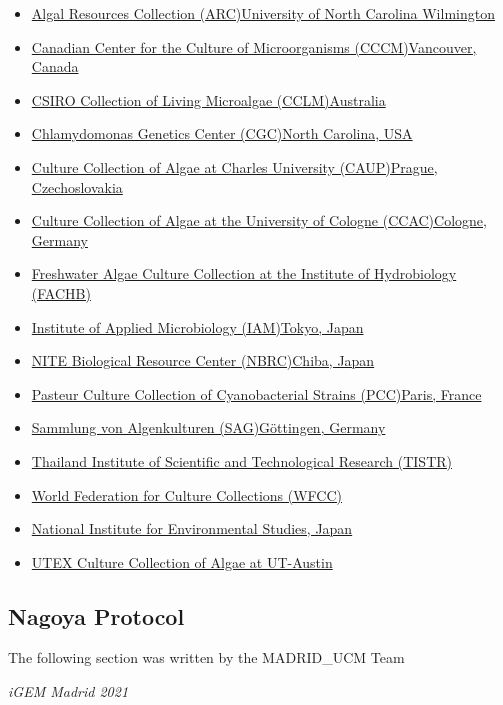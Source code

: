 \begin{itemize}
    \item \href{http://www.algalresourcescollection.com/}{Algal Resources Collection (ARC)University of North Carolina Wilmington}
\item \href{http://www3.botany.ubc.ca/cccm/}{Canadian Center for the Culture of Microorganisms (CCCM)Vancouver, Canada}
\item \href{http://www.csiro.au/en/Research/Collections/ANACC}{CSIRO Collection of Living Microalgae (CCLM)Australia}
\item \href{http://www.chlamy.org/}{Chlamydomonas Genetics Center (CGC)North Carolina, USA}
\item \href{http://botany.natur.cuni.cz/algo/caup.html}{Culture Collection of Algae at Charles University (CAUP)Prague, Czechoslovakia}
\item \href{http://www.ccac.uni-koeln.de/}{Culture Collection of Algae at the University of Cologne (CCAC)Cologne, Germany}
\item \href{http://algae.ihb.ac.cn/English/}{Freshwater Algae Culture Collection at the Institute of Hydrobiology (FACHB)}
\item \href{http://www.iam.u-tokyo.ac.jp/index.html}{Institute of Applied Microbiology (IAM)Tokyo, Japan}
\item \href{http://www.nbrc.nite.go.jp/e/}{NITE Biological Resource Center (NBRC)Chiba, Japan}
\item \href{https://www.pasteur.fr/en/public-health/crbip/distribution/pcc}{Pasteur Culture Collection of Cyanobacterial Strains (PCC)Paris, France}
\item \href{http://www.uni-goettingen.de/en/184982.htmlhttp://www.uni-goettingen.de/en/184982.html}{Sammlung von Algenkulturen (SAG)Göttingen, Germany}
\item \href{https://www.tistr.or.th/tistrnew/main/index.php}{Thailand Institute of Scientific and Technological Research (TISTR)}
\item \href{http://www.wfcc.info/}{World Federation for Culture Collections (WFCC)}
\item \href{https://www.nies.go.jp/index-e.html}{National Institute for Environmental Studies, Japan}
\item \href{https://utex.org/}{UTEX Culture Collection of Algae at UT-Austin}

\end{itemize}

\subsection{Nagoya Protocol}
\epigraph{The following section was written by the MADRID\_UCM Team}{\textit{iGEM Madrid 2021}}
